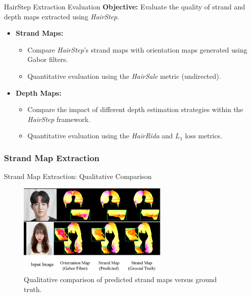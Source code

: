 \begin{frame}[t]{HairStep Extraction Evaluation}
    \textbf{Objective:} Evaluate the quality of strand and depth maps extracted using \emph{HairStep}.

    \vspace{5pt}
    \begin{itemize}
        \item \textbf{Strand Maps:}
        \begin{itemize}
            \item Compare \emph{HairStep}'s strand maps with orientation maps generated using Gabor filters.
            \item Quantitative evaluation using the \emph{HairSale} metric (undirected).
        \end{itemize}
        \item \textbf{Depth Maps:}
        \begin{itemize}
            \item Compare the impact of different depth estimation strategies within the \emph{HairStep} framework.
            \item Quantitative evaluation using the \emph{HairRida} and $L_1$ loss metrics.
        \end{itemize}
    \end{itemize}
\end{frame}

\subsubsection{Strand Map Extraction}

\begin{frame}{Strand Map Extraction: Qualitative Comparison}
    \begin{figure}
        \centering
        \includegraphics[width=0.65\textwidth]{assets/figures/eval/hairsale/strand-prediction-comparison.png}
        \caption{Qualitative comparison of predicted strand maps versus ground truth.}
    \end{figure}
\end{frame}

